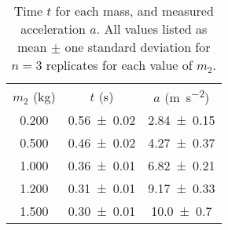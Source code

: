 \begin{table}
\caption{\label{tab:newtable1} Time $t$ for each mass, and measured acceleration $a$. All values listed as mean $\pm$ one standard deviation for $n=3$ replicates for each value of $m_2$.}
\begin{center}
\begin{ruledtabular}
\begin{tabular}{ccc}
$m_2$ (\unit{\kilo\gram}) & $t$ (\unit{\second}) & $a$ (\unit{\meter\per\second\squared}) \\ 
\colrule
\num{0.200} & \num{0.56\pm0.02} & \num{2.84\pm0.15} \\ 
\num{0.500} & \num{0.46\pm0.02} & \num{4.27\pm0.37} \\ 
\num{1.000} & \num{0.36\pm0.01} & \num{6.82\pm0.21} \\ 
\num{1.200} & \num{0.31\pm0.01} & \num{9.17\pm0.33} \\ 
\num{1.500} & \num{0.30\pm0.01} & \num{10.0\pm0.7} \\ 
\end{tabular}
\end{ruledtabular}
\end{center}
\end{table}
